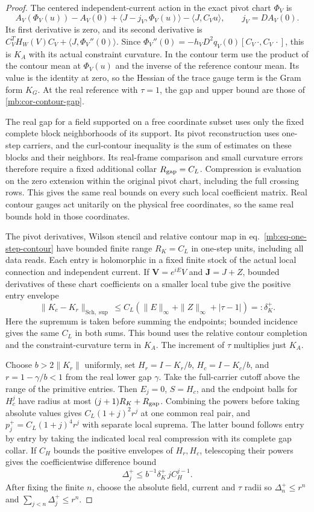 \documentclass[11pt,letterpaper,reqno]{amsart}
\numberwithin{equation}{section}
\renewcommand{\eqref}[1]{\textup{eq.~\ref{#1}}}
\theoremstyle{definition}
\theoremstyle{remark}
\begin{document}
\begin{proof}
The centered independent-current action in the exact pivot chart \(\Phi_V\) is
\[
 A_V(\Phi_V(u))-A_V(0)
       +\langle J-j_V,\Phi_V(u)\rangle-\langle J,C_Vu\rangle,
 \qquad j_V=DA_V(0).
\]
Its first derivative is zero, and its second derivative is \(C_V^T H_W(V) C_V+\langle J,\Phi_V''(0)\rangle\). Since \(\Phi_V''(0)=-h_VD^2q_V(0)[C_V\,\cdot,C_V\,\cdot]\), this is \(K_A\) with its actual constraint curvature. In the contour term use the product of the contour mean at \(\Phi_V(u)\) and the inverse of the reference contour mean. Its value is the identity at zero, so the Hessian of the trace gauge term is the Gram form \(K_G\). At the real reference with \(\tau=1\), the gap and upper bound are those of \cref{mb:cor-contour-gap}.

The real gap for a field supported on a free coordinate subset uses only the fixed complete block neighborhoods of its support. Its pivot reconstruction uses one-step carriers, and the curl-contour inequality is the sum of estimates on these blocks and their neighbors. Its real-frame comparison and small curvature errors therefore require a fixed additional collar \(R_{\rm gap}=C_L\). Compression is evaluation on the zero extension within the original pivot chart, including the full crossing rows. This gives the same real bounds on every such local coefficient matrix. Real contour gauges act unitarily on the physical free coordinates, so the same real bounds hold in those coordinates.

The pivot derivatives, Wilson stencil and relative contour map in \eqref{mb:eq-one-step-contour} have bounded finite range \(R_K=C_L\) in one-step units, including all data reads. Each entry is holomorphic in a fixed finite stock of the actual local connection and independent current. If \(\mathbf V=e^{iE}V\) and \(\mathbf J=J+Z\), bounded derivatives of these chart coefficients on a smaller local tube give the positive entry envelope
\[
 \|K_c-K_r\|_{\mathrm{Sch},\sup}
      \le C_L(\|E\|_\infty+\|Z\|_\infty+|\tau-1|)
      =:\delta_K^+ .
\]
Here the supremum is taken before summing the endpoints; bounded incidence gives the same \(C_L\) in both sums. This bound uses the relative contour completion and the constraint-curvature term in \(K_A\). The increment of \(\tau\) multiplies just \(K_A\).

Choose \(b>2\|K_r\|\) uniformly, set \(H_r=I-K_r/b\), \(H_c=I-K_c/b\), and \(r=1-\gamma/b<1\) from the real lower gap \(\gamma\). Take the full-carrier cutoff above the range of the primitive entries. Then \(E_j=0\), \(S=H_c\), and the endpoint balls for \(H_c^j\) have radius at most \((j+1)R_K+R_{\rm gap}\). Combining the powers before taking absolute values gives \(C_L(1+j)^2r^j\) at one common real pair, and \(p_j^+=C_L(1+j)^4r^j\) with separate local suprema. The latter bound follows entry by entry by taking the indicated local real compression with its complete gap collar. If \(C_H\) bounds the positive envelopes of \(H_r,H_c\), telescoping their powers gives the coefficientwise difference bound
\[
 \Delta_j^+\le b^{-1}\delta_K^+\,jC_H^{j-1}.
\]
After fixing the finite \(n\), choose the absolute field, current and \(\tau\) radii so \(\Delta_n^+\le r^n\) and \(\sum_{j<n}\Delta_j^+\le r^n\).


\end{proof}
\end{document}
